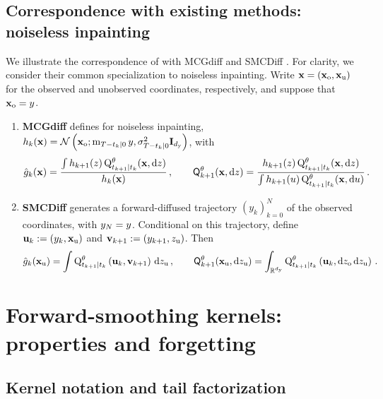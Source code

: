 \documentclass[11pt]{article}
\theoremstyle{plain}
\theoremstyle{definition}
\theoremstyle{remark}
\begin{document}
\subsection{Correspondence with existing methods: noiseless inpainting}
\label{app:noiseless_inpainting_correspondence}

We illustrate the correspondence of  with MCGdiff \citep{cardoso2024monte} and SMCDiff \citep{trippe2023diffusion}. For clarity, we consider their common specialization to noiseless inpainting. Write $\mathbf{x}=(\mathbf{x}_{\mathrm{o}},\mathbf{x}_{\mathrm{u}})$ for the observed and unobserved coordinates, respectively, and suppose that $\mathbf{x}_{\mathrm{o}}=y$.
%
\begin{enumerate}[leftmargin=*,label=(\roman*),itemsep=1pt]
\item \textbf{MCGdiff} defines for noiseless inpainting, $h_k(\x) = \gaussiand{ \fwdmean{0}{T-t_k}\xobs }{ \fwdvar{0}{T-t_k}\Id_{\dobs} }[\x_{\rm o}]$, with
$$
\approxpot{k}(\x) = \frac{ \int h_{k+1}(z)\, \approxbwdker{t_k}[t_{k+1}](\x,\rmd z) }{ h_k(\x) } \eqsp,
\qquad \mk{k+1}[\theta](\x,\rmd z) = \frac{ h_{k+1}(z)\, \approxbwdker{t_k}[t_{k+1}](\x,\rmd z) }{ \int h_{k+1}(u)\, \approxbwdker{t_k}[t_{k+1}](\x,\rmd u) } \eqsp.
$$

\item \textbf{SMCDiff} generates a forward-diffused trajectory $(y_k)_{k=0}^N$ of the observed coordinates, with $y_N=y$. Conditional on this trajectory, define $\mathbf u_k := (y_k,\mathbf{x}_{\rm u})$ and $\mathbf v_{k+1} := (y_{k+1},z_{\rm u})$. Then
$$
\approxpot{k}(\x_{\rm u})
= \int \approxbwdker{t_k}[t_{k+1}] \left( \mathbf u_k,\mathbf v_{k+1} \right) \,\rmd z_{\rm u} \eqsp, \qquad \mk{k+1}[\theta](\x_{\rm u},\rmd z_{\rm u})
= \int_{\rset^{\dobs}} \approxbwdker{t_k}[t_{k+1}] \left( \mathbf u_k, \rmd z_{\rm o}\,\rmd z_{\rm u} \right) \eqsp.
$$
\end{enumerate}

\section{Forward-smoothing kernels: properties and forgetting}
\label{app:forward_smothing_forgetting}


\subsection{Kernel notation and tail factorization}
\end{document}
